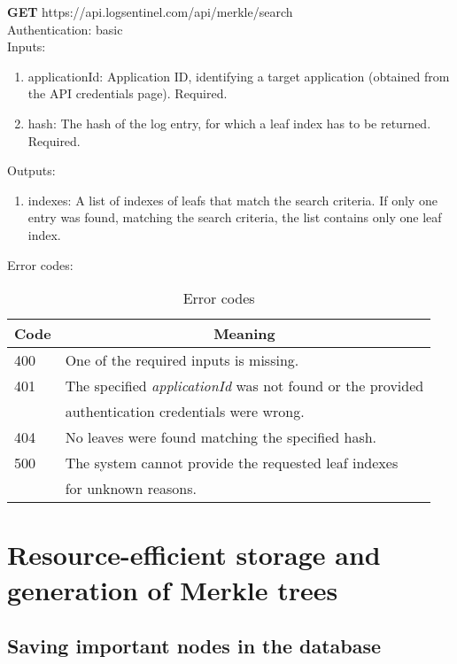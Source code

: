 \documentclass{article}
\begin{document}
		\textbf{GET} https://api.logsentinel.com/api/merkle/search \\
		
		\noindent Authentication: basic \\
		
		\noindent Inputs:
		\begin{enumerate}
			\item applicationId: Application ID, identifying a target application (obtained from the API credentials page). Required.
			\item hash: The hash of the log entry, for which a leaf index has to be returned. Required.
		\end{enumerate}
		
		\noindent Outputs:
		\begin{enumerate}
			\item indexes: A list of indexes of leafs that match the search criteria. If only one entry was found, matching the search criteria, the list contains only one leaf index.
		\end{enumerate}
		
		\noindent Error codes:
		\begin{table}[H]
			\centering
			\caption{Error codes}
			\label{merkle-search-error-codes}
			\begin{tabular}{|l|l|}
				\hline
				\multicolumn{1}{|c|}{Code} & 	\multicolumn{1}{c|}{Meaning} \\ \hline
				400 & One of the required inputs is missing. \\ \hline
				401 & The specified \textit{applicationId} was not found or the provided \\
				& authentication credentials were wrong. \\ \hline
				404 & No leaves were found matching the specified hash. \\ \hline
				500 & The system cannot provide the requested leaf indexes \\ & for unknown  reasons. \\ \hline
			\end{tabular}
		\end{table}
	 
    
\section{Resource-efficient storage and generation of Merkle trees}

	\subsection{Saving important nodes in the database}
	 \label{saving-important-nodes}
	 \cite{CT:2} \cite{cryptoeprint:2016:683}
	 \cite{ct:org}

{}

\end{document}
